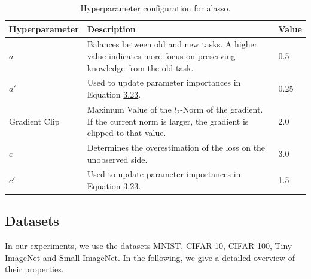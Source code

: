 \begin{table}[!htb]
    \centering
    \begin{tabularx}{\textwidth}{| l | X | l |} 
        \hline
        Hyperparameter & Description & Value \\ 
        \hline 
        \hline
        $a$ & Balances between old and new tasks. A higher value indicates more focus
        on preserving knowledge from the old task. & 0.5  \\ 
        \hline
        $a'$ & Used to update parameter importances in Equation \hyperref[eq:ALASSO_Small_Omega]{3.23}. & 0.25  \\
        \hline
        Gradient Clip & Maximum Value of the $l_2$-Norm of the gradient. If the current norm is larger, the
        gradient is clipped to that value. & 2.0 \\ 
        \hline
        $c$ & Determines the overestimation of the loss on the unobserved side. & 3.0 \\
        \hline
        $c'$ & Used to update parameter importances in Equation \hyperref[eq:ALASSO_Small_Omega]{3.23}. & 1.5 \\
        \hline
    \end{tabularx}
    \caption{Hyperparameter configuration for \gls{alasso}.}
    \label{fig:AlassoParams}
\end{table}

\newpage

\subsection{Datasets}
\label{sec:Appendix:Datasets}
In our experiments, we use the datasets MNIST, CIFAR-10, CIFAR-100, Tiny ImageNet and Small ImageNet. In the following, we give a detailed overview of their properties.

